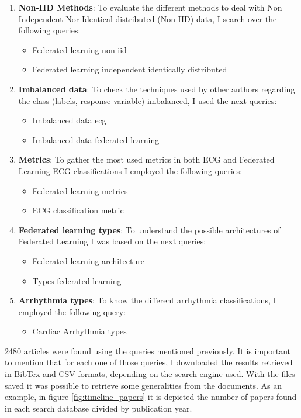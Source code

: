 \begin{enumerate}
    \item \textbf{Non-IID Methods}: To evaluate the different methods to deal with Non Independent Nor Identical distributed (Non-IID) data, I search over the following queries:
    \begin{itemize}
        \item Federated learning non iid
        \item Federated learning independent identically distributed
    \end{itemize}
    \item \textbf{Imbalanced data}: To check the techniques used by other authors regarding the class (labels, response variable) imbalanced, I used the next queries:
    \begin{itemize}
        \item Imbalanced data ecg
        \item Imbalanced data federated learning
    \end{itemize}
    \item \textbf{Metrics}: To gather the most used metrics in both ECG and Federated Learning ECG classifications I employed the following queries:
    \begin{itemize}
        \item Federated learning metrics
        \item ECG classification metric
    \end{itemize}
    \item \textbf{Federated learning types}: To understand the possible architectures of Federated Learning I was based on the next queries:
    \begin{itemize}
        \item Federated learning architecture
        \item Types federated learning
    \end{itemize}
    \item \textbf{Arrhythmia types}: To know the different arrhythmia classifications, I employed the following query:
    \begin{itemize}
        \item Cardiac Arrhythmia types
    \end{itemize}
\end{enumerate}


2480 articles were found using the queries mentioned previously. It is important to mention that for each one of those queries, I downloaded the results retrieved in BibTex and CSV formats, depending on the search engine used. With the files saved it was possible to retrieve some generalities from the documents. As an example, in figure \ref{fig:timeline_papers} it is depicted the number of papers found in each search database divided by publication year.

